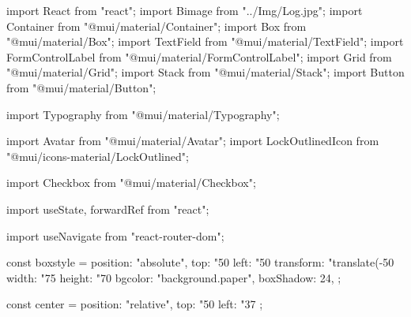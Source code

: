 import React from "react";
import Bimage from "../Img/Log.jpg";
import Container from "@mui/material/Container";
import Box from "@mui/material/Box";
import TextField from "@mui/material/TextField";
import FormControlLabel from "@mui/material/FormControlLabel";
import Grid from "@mui/material/Grid";
import Stack from "@mui/material/Stack";
import Button from "@mui/material/Button";

import Typography from "@mui/material/Typography";

import Avatar from "@mui/material/Avatar";
import LockOutlinedIcon from "@mui/icons-material/LockOutlined";

import Checkbox from "@mui/material/Checkbox";

import { useState, forwardRef } from "react";

import { useNavigate } from "react-router-dom";

const boxstyle = {
  position: "absolute",
  top: "50%
  left: "50%
  transform: "translate(-50%
  width: "75%
  height: "70%
  bgcolor: "background.paper",
  boxShadow: 24,
};

const center = {
  position: "relative",
  top: "50%
  left: "37%
};


